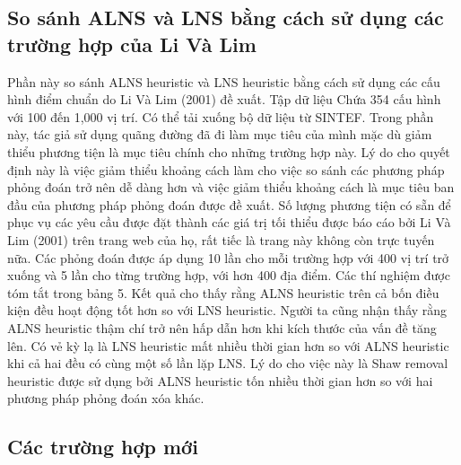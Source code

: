 \subsection{So sánh ALNS và LNS bằng cách sử dụng các trường hợp của Li Và Lim}
Phần này so sánh ALNS heuristic và LNS heuristic bằng cách sử dụng các cấu hình điểm chuẩn do Li Và Lim (2001) đề xuất. Tập dữ liệu Chứa 354 cấu hình với 100 đến 1,000 vị trí. Có thể tải xuống bộ dữ liệu từ SINTEF.
Trong phần này, tác giả sử dụng quãng đường đã đi làm mục tiêu của mình mặc dù giảm thiểu phương tiện là mục tiêu chính cho những trường hợp này. Lý do cho quyết định này là việc giảm thiểu khoảng cách làm cho việc so sánh các phương pháp phỏng đoán trở nên dễ dàng hơn và việc giảm thiểu khoảng cách là mục tiêu ban đầu của phương pháp phỏng đoán được đề xuất. Số lượng phương tiện có sẵn để phục vụ các yêu cầu được đặt thành các giá trị tối thiểu được báo cáo bởi Li Và Lim (2001) trên trang web của họ, rất tiếc là trang này không còn trực tuyến nữa. Các phỏng đoán được áp dụng 10 lần cho mỗi trường hợp với 400 vị trí trở xuống và 5 lần cho từng trường hợp, với hơn 400 địa điểm. Các thí nghiệm được tóm tắt trong bảng 5.
Kết quả cho thấy rằng ALNS heuristic trên cả bốn điều kiện đều hoạt động tốt hơn so với LNS heuristic. Người ta cũng nhận thấy rằng ALNS heuristic thậm chí trở nên hấp dẫn hơn khi kích thước của vấn đề tăng lên. Có vẻ kỳ lạ là LNS heuristic mất nhiều thời gian hơn so với ALNS heuristic khi cả hai đều có cùng một số lần lặp LNS. Lý do cho việc này là Shaw removal heuristic được sử dụng bởi ALNS heuristic tốn nhiều thời gian hơn so với hai phương pháp phỏng đoán xóa khác.

\subsection{Các trường hợp mới}

